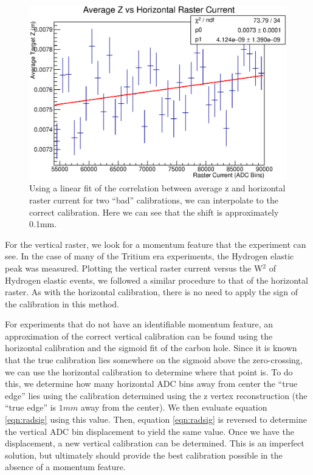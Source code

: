 \begin{figure}
	\includegraphics[width=\textwidth]{./app1/figures/avgzvx.eps}
	\caption{Using a linear fit of the correlation between average z and horizontal raster current for two ``bad'' calibrations, we can interpolate to the correct calibration. Here we can see that the shift is approximately 0.1mm.}
\end{figure}

For the vertical raster, we look for a momentum feature that the experiment can see. In the case of many of the Tritium era experiments, the Hydrogen elastic peak was measured. Plotting the vertical raster current versus the W$^2$ of Hydrogen elastic events, we followed a similar procedure to that of the horizontal raster. As with the horizontal calibration, there is no need to apply the sign of the calibration in this method.

For experiments that do not have an identifiable momentum feature, an approximation of the correct vertical calibration can be found using the horizontal calibration and the sigmoid fit of the carbon hole. Since it is known that the true calibration lies somewhere on the sigmoid above the zero-crossing, we can use the horizontal calibration to determine where that point is. To do this, we determine how many horizontal ADC bins away from center the ``true edge'' lies using the calibration determined using the z vertex reconstruction (the ``true edge'' is $1mm$ away from the center). We then evaluate equation \ref{eqn:radsig} using this value. Then, equation \ref{eqn:radsig} is reversed to determine the vertical ADC bin displacement to yield the same value. Once we have the displacement, a new vertical calibration can be determined. This is an imperfect solution, but ultimately should provide the best calibration possible in the absence of a momentum feature.

